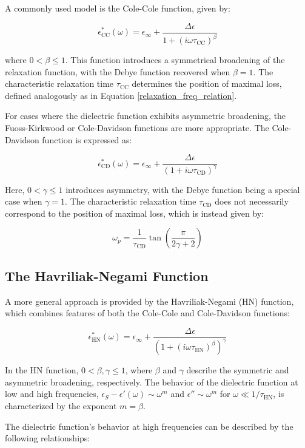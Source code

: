 A commonly used model is the Cole-Cole function, given by:

\[
\epsilon^*_{\text{CC}}(\omega) = \epsilon_\infty + \frac{\Delta \epsilon}{1 + (i \omega \tau_{\text{CC}})^\beta}
\]

where \( 0 < \beta \leq 1 \). This function introduces a symmetrical broadening of the relaxation function, with the Debye function recovered when \( \beta = 1 \). The characteristic relaxation time \( \tau_{\text{CC}} \) determines the position of maximal loss, defined analogously as in Equation \ref{relaxation_freq_relation}.



For cases where the dielectric function exhibits asymmetric broadening, the Fuoss-Kirkwood or Cole-Davidson functions are more appropriate. The Cole-Davidson function is expressed as:

\[
\epsilon^*_{\text{CD}}(\omega) = \epsilon_\infty + \frac{\Delta \epsilon}{(1 + i \omega \tau_{\text{CD}})^\gamma}
\]

Here, \( 0 < \gamma \leq 1 \) introduces asymmetry, with the Debye function being a special case when \( \gamma = 1 \). The characteristic relaxation time \( \tau_{\text{CD}} \) does not necessarily correspond to the position of maximal loss, which is instead given by:

\[
\omega_p = \frac{1}{\tau_{\text{CD}}} \tan\left(\frac{\pi}{2\gamma + 2}\right)
\]

\subsection{The Havriliak-Negami Function}
A more general approach is provided by the Havriliak-Negami (HN) function, which combines features of both the Cole-Cole and Cole-Davidson functions:

\[
\epsilon^*_{\text{HN}}(\omega) = \epsilon_\infty + \frac{\Delta \epsilon}{(1 + (i \omega \tau_{\text{HN}})^\beta)^\gamma}
\]

In the HN function, \( 0 < \beta, \gamma \leq 1 \), where \( \beta \) and \( \gamma \) describe the symmetric and asymmetric broadening, respectively. The behavior of the dielectric function at low and high frequencies, \( \epsilon_S - \epsilon'(\omega) \sim \omega^m \) and \( \epsilon'' \sim \omega^m \) for \( \omega \ll 1/\tau_{\text{HN}} \), is characterized by the exponent \( m = \beta \).


The dielectric function's behavior at high frequencies can be described by the following relationships:


